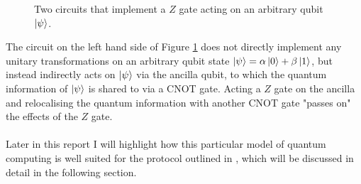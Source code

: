 \begin{figure}
    \begin{center}
    \caption{Two circuits that implement a $Z$ gate acting on an arbitrary qubit $\ket{\psi}$.}
    \label{simple aqc}
    \end{center}
    \end{figure}
The circuit on the left hand side of Figure \ref{simple aqc} does not directly implement any unitary transformations on an arbitrary qubit state $\ket{\psi} = \alpha \ket{0} + \beta \ket{1}$, but instead indirectly acts on $\ket{\psi}$ via the ancilla qubit, to which the quantum information of $\ket{\psi}$ is shared to via a CNOT gate. Acting a $Z$ gate on the ancilla and relocalising the quantum information with another CNOT gate "passes on" the effects of the $Z$ gate.\paragraph{}

Later in this report I will highlight how this particular model of quantum computing is well suited for the protocol outlined in \cite{giordani2020}, which will be discussed in detail in the following section.
